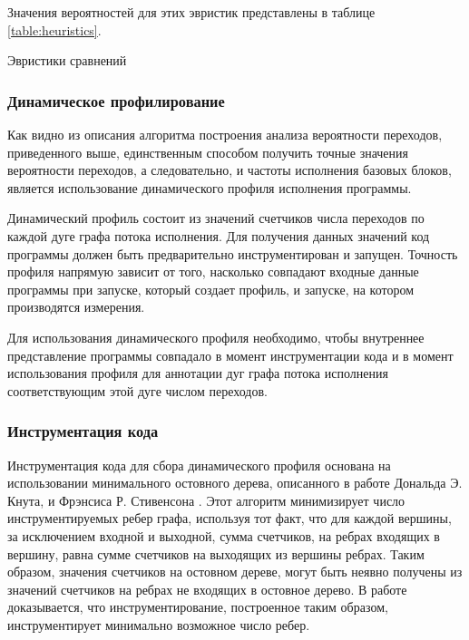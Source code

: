 Значения вероятностей для этих эвристик представлены в таблице \ref{table:heuristics}.

\begin{table}
\caption{Эвристики сравнений}

\label{table:heuristics}
\end{table}

\subsubsection{Динамическое профилирование}

Как видно из описания алгоритма построения анализа вероятности переходов, приведенного выше, единственным способом получить точные значения вероятности переходов, а следовательно, и частоты исполнения базовых блоков, является использование динамического профиля исполнения программы.

Динамический профиль состоит из значений счетчиков числа переходов по каждой дуге графа потока исполнения. Для получения данных значений код программы должен быть предварительно инструментирован и запущен. Точность профиля напрямую зависит от того, насколько совпадают входные данные программы при запуске, который создает профиль, и запуске, на котором производятся измерения.

Для использования динамического профиля необходимо, чтобы внутреннее представление программы совпадало в момент инструментации кода и в момент использования профиля для аннотации дуг графа потока исполнения соответствующим этой дуге числом переходов.

\subsubsection{Инструментация кода}

Инструментация кода для сбора динамического профиля основана на использовании минимального остовного дерева, описанного в работе Дональда Э. Кнута, и Фрэнсиса Р. Стивенсона \cite{Knuth_Stevenson_1973}.
Этот алгоритм минимизирует число инструментируемых ребер графа, используя тот факт, что для каждой вершины, за исключением входной и выходной, сумма счетчиков, на ребрах входящих в вершину, равна сумме счетчиков на выходящих из вершины ребрах.
Таким образом, значения счетчиков на остовном дереве, могут быть неявно получены из значений счетчиков на ребрах не входящих в остовное дерево.
В работе доказывается, что инструментирование, построенное таким образом, инструментирует минимально возможное число ребер.


